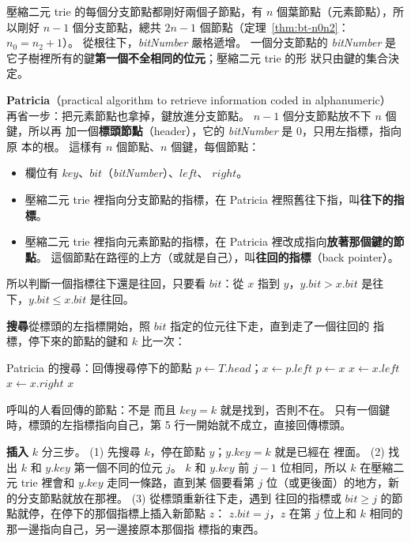 壓縮二元 trie 的每個分支節點都剛好兩個子節點，有 $n$ 個葉節點（元素節點），所以剛好
$n - 1$ 個分支節點，總共 $2n - 1$ 個節點（定理~\ref{thm:bt-n0n2}：$n_0 = n_2 + 1$）。 從根往下，\textit{bitNumber} 嚴格遞增。 一個分支節點的
\textit{bitNumber} 是它子樹裡所有的鍵\textbf{第一個不全相同的位元}；壓縮二元 trie 的形
狀只由鍵的集合決定。

\textbf{Patricia}（practical algorithm to retrieve information coded in alphanumeric）
再省一步：把元素節點也拿掉，鍵放進分支節點。 $n - 1$ 個分支節點放不下 $n$ 個鍵，所以再
加一個\textbf{標頭節點}（header），它的 \textit{bitNumber} 是 $0$，只用左指標，指向原
本的根。 這樣有 $n$ 個節點、$n$ 個鍵，每個節點：
\begin{itemize}
\item 欄位有 $\mathit{key}$、$\mathit{bit}$（\textit{bitNumber}）、$\mathit{left}$、
$\mathit{right}$。
\item 壓縮二元 trie 裡指向分支節點的指標，在 Patricia 裡照舊往下指，叫\textbf{往下的指
標}。
\item 壓縮二元 trie 裡指向元素節點的指標，在 Patricia 裡改成指向\textbf{放著那個鍵的節點}。
這個節點在路徑的上方（或就是自己），叫\textbf{往回的指標}（back pointer）。
\end{itemize}
所以判斷一個指標往下還是往回，只要看 $\mathit{bit}$：從 $x$ 指到 $y$，$y.\mathit{bit} >
x.\mathit{bit}$ 是往下，$y.\mathit{bit} \le x.\mathit{bit}$ 是往回。

\textbf{搜尋}從標頭的左指標開始，照 $\mathit{bit}$ 指定的位元往下走，直到走了一個往回的
指標，停下來的節點的鍵和 $k$ 比一次：

\begin{pseudo}[label=alg:mw-pat-search, unbreakable]{Patricia 的搜尋：回傳搜尋停下的節點}
        \State \Return \NIL
    \EndIf
    \State $p \gets T.\mathit{head}$；$x \gets p.\mathit{left}$
        \State $p \gets x$
            \State $x \gets x.\mathit{left}$
        \Else
            \State $x \gets x.\mathit{right}$
        \EndIf
    \EndWhile
    \State \Return $x$
\EndFunction
\end{pseudo}

呼叫的人看回傳的節點：不是 \NIL 而且 $\mathit{key} = k$ 就是找到，否則不在。 只有一個鍵
時，標頭的左指標指向自己，第 5 行一開始就不成立，直接回傳標頭。

\textbf{插入} $k$ 分三步。 (1) 先搜尋 $k$，停在節點 $y$；$y.\mathit{key} = k$ 就是已經在
裡面。 (2) 找出 $k$ 和 $y.\mathit{key}$ 第一個不同的位元 $j$。 $k$ 和 $y.\mathit{key}$
前 $j - 1$ 位相同，所以 $k$ 在壓縮二元 trie 裡會和 $y.\mathit{key}$ 走同一條路，直到某
個要看第 $j$ 位（或更後面）的地方，新的分支節點就放在那裡。 (3) 從標頭重新往下走，遇到
往回的指標或 $\mathit{bit} \ge j$ 的節點就停，在停下的那個指標上插入新節點 $z$：
$z.\mathit{bit} = j$，$z$ 在第 $j$ 位上和 $k$ 相同的那一邊指向自己，另一邊接原本那個指
標指的東西。

